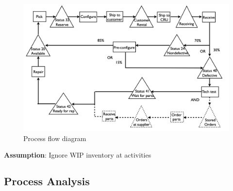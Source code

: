 \documentclass[
  paper=a4,
,captions=tableheading
]{scrartcl}
\begin{document}
\begin{figure}
\centering
\includegraphics{assets/images/process-flow-CRU.png}
\caption{Process flow diagram}
\end{figure}

\textbf{Assumption}: Ignore WIP inventory at activities

\hypertarget{process-analysis}{%
\subsection{Process Analysis}\label{process-analysis}}
\end{document}
